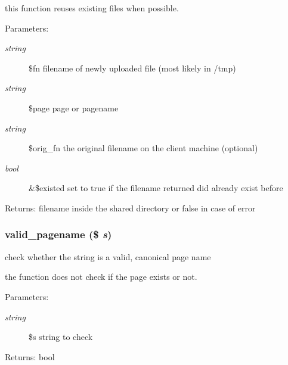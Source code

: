 this function reuses existing files when possible. \begin{Desc}
\item[Parameters:]
\begin{description}
\item[{\em string}]\$fn filename of newly uploaded file (most likely in /tmp) \item[{\em string}]\$page page or pagename \item[{\em string}]\$orig\_\-fn the original filename on the client machine (optional) \item[{\em bool}]\&\$existed set to true if the filename returned did already exist before \end{description}
\end{Desc}
\begin{Desc}
\item[Returns:]filename inside the shared directory or false in case of error \end{Desc}
\hypertarget{common_8inc_8php_0ef613d233a6e62f7e631b8dfcd710bf}{
\subsubsection[{valid\_\-pagename}]{\setlength{\rightskip}{0pt plus 5cm}valid\_\-pagename (\$ {\em s})}}
\label{common_8inc_8php_0ef613d233a6e62f7e631b8dfcd710bf}


check whether the string is a valid, canonical page name

the function does not check if the page exists or not. \begin{Desc}
\item[Parameters:]
\begin{description}
\item[{\em string}]\$s string to check \end{description}
\end{Desc}
\begin{Desc}
\item[Returns:]bool \end{Desc}
